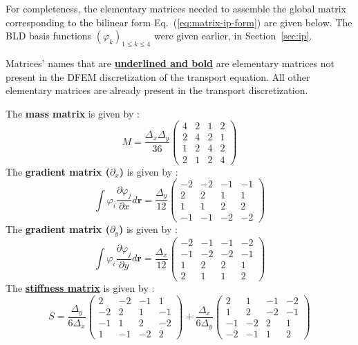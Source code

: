 \documentclass{mc2013}
\newcommand\br{\mathbf{r}}
\newcommand\tf{\varphi}
\renewcommand{\(}{\left(}
\renewcommand{\)}{\right)}
\renewcommand{\[}{\left[}
\renewcommand{\]}{\right]}
\newcommand{\eqt}[1]{Eq.~(\ref{#1})}                     %
\begin{document}
For completeness, the elementary matrices needed to assemble the global matrix corresponding to the
bilinear form \eqt{eq:matrix-ip-form} are given below. The BLD basis functions $\( \tf_{k} \)_{1 \le k \le 4}$
were given earlier, in Section~\ref{sec:ip}. 

Matrices' names that are \underline{{\bf underlined and bold}} are elementary matrices not present in the DFEM
discretization of the transport equation. All other elementary matrices are already present in the transport discretization.

The {\bf mass matrix} is given by :
\begin{equation}
M = \frac{{\Delta _x}{\Delta _y}}{36}
\begin{pmatrix}
4 & 2 & 1 & 2 \\
2 & 4 & 2 & 1 \\
1 & 2 & 4 & 2 \\
2 & 1 & 2 & 4 
\end{pmatrix}
\end{equation}
The {\bf gradient matrix ($\partial_x$)} is given by :
\begin{equation}
\int \tf_i \frac{\partial \tf_j}{\partial x} d\br = \frac{{\Delta _y}}{12}
\begin{pmatrix}
 -2 & -2 & -1 & -1 \\
  2 &  2 &  1 &  1\\
  1 &  1 &  2 &  2\\
 -1 & -1 & -2 & -2
\end{pmatrix}
\end{equation}
The {\bf gradient matrix ($\partial_y$)} is given by :
\begin{equation}
\int \tf_i \frac{\partial \tf_j}{\partial y} d\br = \frac{{\Delta _x}}{12}
\begin{pmatrix}
 -2 & -1 & -1 & -2 \\
 -1 & -2 & -2 & -1\\
  1 &  2 &  2 &  1\\
  2 &  1 &  1 &  2
\end{pmatrix}
\end{equation}
The \underline{{\bf stiffness matrix}} is given by :
\begin{equation}
S = \frac{{\Delta _y}}{6{\Delta _x}}
\begin{pmatrix}
2 & -2 & -1 & 1 \\
-2 & 2 & 1 & -1 \\
-1 & 1 & 2 & -2 \\
1 & -1 & -2 & 2 
\end{pmatrix}
+ \frac{{\Delta _x}}{6{\Delta _y}}
\begin{pmatrix}
2 & 1 & -1 & -2 \\
1 & 2 & -2 & -1 \\
-1 & -2 & 2 & 1 \\
-2 & -1 & 1 & 2 
\end{pmatrix}
\end{equation}
\end{document}
